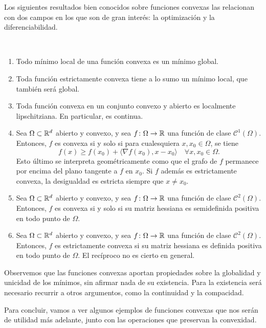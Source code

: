 Los siguientes resultados bien conocidos sobre funciones convexas las relacionan con dos campos en los que son de gran interés: la optimización y la diferenciabilidad.

\begin{prop}~ \label{prop:convex_functions_opt_dif}
    \begin{enumerate}
        \item Todo mínimo local de una función convexa es un mínimo global.
        \item Toda función estrictamente convexa tiene a lo sumo un mínimo local, que también será global.
        \item Toda función convexa en un conjunto convexo y abierto es localmente lipschitziana. En particular, es continua.
        \item Sea $\Omega \subset \mathbb{R}^d$ abierto y convexo, y sea $f \colon \Omega \to \mathbb{R}$ una función de clase $\mathcal{C}^1(\Omega)$. Entonces, $f$ es convexa si y solo si para cualesquiera $x, x_0 \in \Omega$, se tiene \label{item:prop:convex_functions:gradient}
        \[ f(x) \ge f(x_0) + \langle \nabla f(x_0), x - x_0 \rangle \quad \forall x, x_0 \in \Omega. \]
        Esto último se interpreta geométricamente como que el grafo de $f$ permanece por encima del plano tangente a $f$ en $x_0$. Si $f$ además es estrictamente convexa, la desigualdad es estricta siempre que $x \ne x_0$.
        \item Sea $\Omega \subset \mathbb{R}^d$ abierto y convexo, y sea $f \colon \Omega \to \mathbb{R}$ una función de clase $\mathcal{C}^2(\Omega)$. Entonces, $f$ es convexa si y solo si su matriz hessiana es semidefinida positiva en todo punto de $\Omega$.
        \item Sea $\Omega \subset \mathbb{R}^d$ abierto y convexo, y sea $f \colon \Omega \to \mathbb{R}$ una función de clase $\mathcal{C}^2(\Omega)$. Entonces, $f$ es estrictamente convexa si su matriz hessiana es definida positiva en todo punto de $\Omega$. El recíproco no es cierto en general.
    \end{enumerate}
\end{prop}
Observemos que las funciones convexas aportan propiedades sobre la globalidad y unicidad de los mínimos, sin afirmar nada de su existencia. Para la existencia será necesario recurrir a otros argumentos, como la continuidad y la compacidad.

Para concluir, vamos a ver algunos ejemplos de funciones convexas que nos serán de utilidad más adelante, junto con las operaciones que preservan la convexidad.

